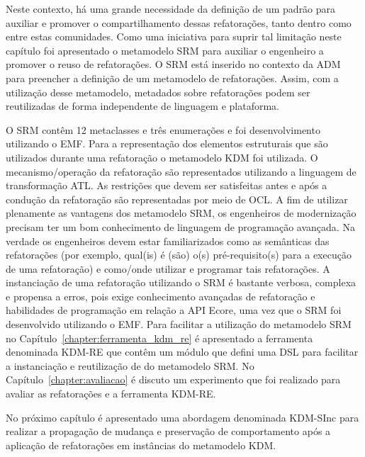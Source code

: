 Neste contexto, há uma grande necessidade da definição de um padrão para auxiliar e promover o compartilhamento dessas refatorações, tanto dentro como entre estas comunidades. Como uma iniciativa para suprir tal limitação neste capítulo foi apresentado o metamodelo SRM para auxiliar o engenheiro a promover o reuso de refatorações. O SRM está inserido no contexto da ADM para preencher a definição de um metamodelo de refatorações. Assim, com a utilização desse metamodelo, metadados sobre refatorações podem ser reutilizadas de forma independente de linguagem e plataforma.

O SRM contêm 12 metaclasses e três enumerações e foi desenvolvimento utilizando o EMF. Para a representação dos elementos estruturais que são utilizados durante uma refatoração o metamodelo KDM foi utilizada. O mecanismo/operação da refatoração são representados utilizando a linguagem de transformação ATL. As restrições que devem ser satisfeitas antes e após a condução da refatoração são representadas por meio de OCL. A fim de utilizar plenamente as vantagens dos metamodelo SRM, os engenheiros de modernização precisam ter um bom conhecimento de linguagem de programação avançada. Na verdade os engenheiros devem estar familiarizados como as semânticas das refatorações (por exemplo, qual(is) é (são) o(s) pré-requisito(s) para a execução de uma refatoração) e como/onde utilizar e programar tais refatorações. A instanciação de uma refatoração utilizando o SRM é bastante verbosa, complexa e propensa a erros, pois exige conhecimento avançadas de refatoração e habilidades de programação em relação a API Ecore, uma vez que o SRM foi desenvolvido utilizando o EMF. Para facilitar a utilização do metamodelo SRM no Capítulo~\ref{chapter:ferramenta_kdm_re} é apresentado a ferramenta denominada KDM-RE que contêm um módulo que defini uma DSL para facilitar a instanciação e reutilização de do metamodelo SRM. No Capítulo~\ref{chapter:avaliacao} é discuto um experimento que foi realizado para avaliar as refatorações e a ferramenta KDM-RE.

No próximo capítulo é apresentado uma abordagem denominada KDM-SInc para realizar a propagação de mudança e preservação de comportamento após a aplicação de refatorações em instâncias do metamodelo KDM. 


